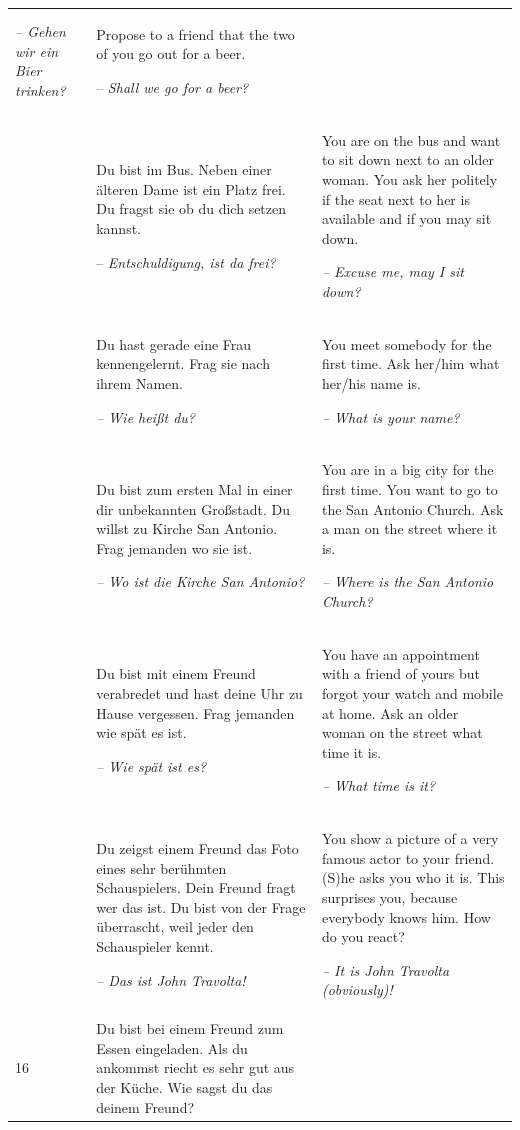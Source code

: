 \begin{xltabular}{\textwidth}{lQQ}
{\itshape -- Gehen wir ein Bier trinken?} & Propose to a friend that the two of you go out for a beer.

-- \textit{Shall we go for a beer?}\\
 & Du bist im Bus. Neben einer älteren Dame ist ein Platz frei. Du fragst sie ob du dich setzen kannst.

-- \textit{Entschuldigung, ist da frei?} & You are on the bus and want to sit down next to an older woman. You ask her politely if the seat next to her is available and if you may sit down.

{\itshape -- Excuse me, may I sit down?}\\
 & Du hast gerade eine Frau kennengelernt. Frag sie nach ihrem Namen.

{\itshape -- Wie heißt du?} & You meet somebody for the first time. Ask her/him what her/his name is.

{\itshape -- What is your name?}\\
 & Du bist zum ersten Mal in einer dir unbekannten Großstadt. Du willst zu Kirche San Antonio. Frag jemanden wo sie ist.

\textit{-- Wo ist die Kirche San Antonio?} & You are in a big city for the first time. You want to go to the San Antonio Church. Ask a man on the street where it is.

{\itshape -- Where is the San Antonio Church?}\\
 & Du bist mit einem Freund verabredet und hast deine Uhr zu Hause vergessen. Frag jemanden wie spät es ist.

\textit{-- Wie spät ist es?} & You have an appointment with a friend of yours but forgot your watch and mobile at home. Ask an older woman on the street what time it is.

{\itshape -- What time is it?}\\
 & Du zeigst einem Freund das Foto eines sehr berühmten Schauspielers. Dein Freund fragt wer das ist. Du bist von der Frage überrascht, weil jeder den Schauspieler kennt.

\textit{-- Das ist John Travolta!} & You show a picture of a very famous actor to your friend. (S)he asks you who it is. This surprises you, because everybody knows him. How do you react?

{\itshape -- It is John Travolta (obviously)!}\\
16 & Du bist bei einem Freund zum Essen eingeladen. Als du ankommst riecht es sehr gut aus der Küche. Wie sagst du das deinem Freund?


\end{xltabular}
